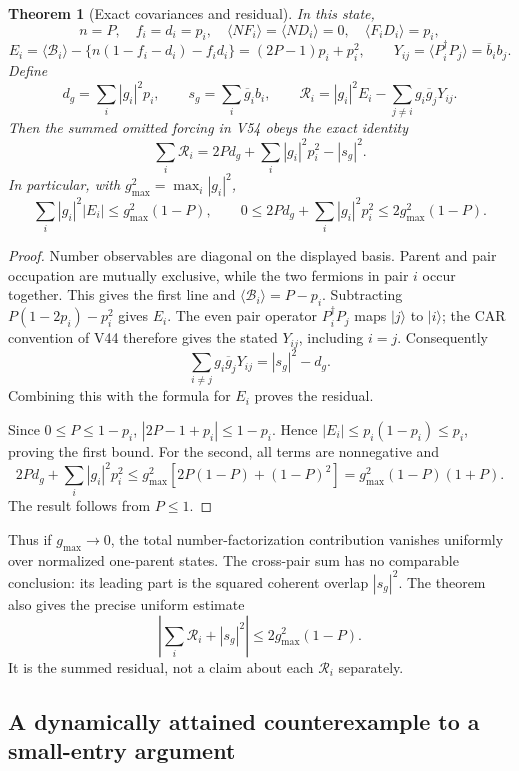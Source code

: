 \documentclass[11pt]{article}
\newtheorem{theorem}{Theorem}[section]
\theoremstyle{remark}
\begin{document}
\begin{theorem}[Exact covariances and residual]
\label{thm:v20v56-residual}
In this state,
\[
 n=P,\quad f_i=d_i=p_i,\quad
 \langle NF_i\rangle=\langle ND_i\rangle=0,\quad
 \langle F_iD_i\rangle=p_i,
\]
\[
 E_i=\langle\mathcal B_i\rangle-
       \{n(1-f_i-d_i)-f_id_i\}
       =(2P-1)p_i+p_i^2,\qquad
 Y_{ij}=\langle P_i^\dagger P_j\rangle=\overline b_i b_j .
\]
Define
\[
 d_g=\sum_i|g_i|^2p_i,\qquad s_g=\sum_i\overline g_i b_i,
 \qquad
 \mathcal R_i=|g_i|^2E_i-\sum_{j\ne i}g_i\overline g_jY_{ij}.
\]
Then the summed omitted forcing in V54 obeys the exact identity
\[
 \sum_i\mathcal R_i
   =2P d_g+\sum_i|g_i|^2p_i^2-|s_g|^2.
\]
In particular, with \(g_{\max}^2=\max_i|g_i|^2\),
\[
 \sum_i |g_i|^2|E_i|\leq g_{\max}^2(1-P),\qquad
 0\leq 2P d_g+\sum_i|g_i|^2p_i^2
                         \leq2g_{\max}^2(1-P).
\]
\end{theorem}
\begin{proof}
Number observables are diagonal on the displayed basis.
Parent and pair occupation are mutually exclusive, while the
two fermions in pair \(i\) occur together.  This gives the
first line and \(\langle\mathcal B_i\rangle=P-p_i\).
Subtracting \(P(1-2p_i)-p_i^2\) gives \(E_i\).
The even pair operator \(P_i^\dagger P_j\) maps \(|j\rangle\)
to \(|i\rangle\); the CAR convention of V44 therefore gives
the stated \(Y_{ij}\), including \(i=j\).
Consequently
\[
 \sum_{i\ne j}g_i\overline g_jY_{ij}
                =|s_g|^2-d_g.
\]
Combining this with the formula for \(E_i\) proves the residual.

Since \(0\leq P\leq1-p_i\),
\(|2P-1+p_i|\leq1-p_i\).  Hence
\(|E_i|\leq p_i(1-p_i)\leq p_i\), proving the first bound.
For the second, all terms are nonnegative and
\[
 2P d_g+\sum_i|g_i|^2p_i^2
 \leq g_{\max}^2[2P(1-P)+(1-P)^2]
 =g_{\max}^2(1-P)(1+P).
\]
The result follows from \(P\leq1\).
\end{proof}

Thus if \(g_{\max}\to0\), the total number-factorization
contribution vanishes uniformly over normalized one-parent
states.  The cross-pair sum has no comparable conclusion:
its leading part is the squared coherent overlap \(|s_g|^2\).
The theorem also gives the precise uniform estimate
\[
 \left|\sum_i\mathcal R_i+|s_g|^2\right|
                   \leq2g_{\max}^2(1-P).
\]
It is the summed residual, not a claim about each
\(\mathcal R_i\) separately.

\subsection{A dynamically attained counterexample to a small-entry argument}
\end{document}
